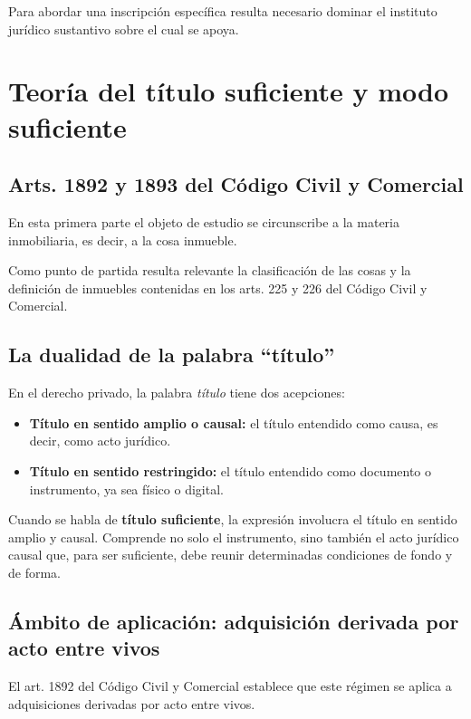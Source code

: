 \documentclass[12pt]{book}
\begin{document}
Para abordar una inscripci\'on espec\'ifica resulta necesario dominar el instituto jur\'idico sustantivo sobre el cual se apoya.

\chapter{Teor\'ia del t\'itulo suficiente y modo suficiente}

\section{Arts. 1892 y 1893 del C\'odigo Civil y Comercial}

En esta primera parte el objeto de estudio se circunscribe a la materia inmobiliaria, es decir, a la cosa inmueble.

Como punto de partida resulta relevante la clasificaci\'on de las cosas y la definici\'on de inmuebles contenidas en los arts. 225 y 226 del C\'odigo Civil y Comercial.

\section{La dualidad de la palabra ``t\'itulo''}

En el derecho privado, la palabra \textit{t\'itulo} tiene dos acepciones:

\begin{itemize}
    \item \textbf{T\'itulo en sentido amplio o causal:} el t\'itulo entendido como causa, es decir, como acto jur\'idico.
    \item \textbf{T\'itulo en sentido restringido:} el t\'itulo entendido como documento o instrumento, ya sea f\'isico o digital.
\end{itemize}

Cuando se habla de \textbf{t\'itulo suficiente}, la expresi\'on involucra el t\'itulo en sentido amplio y causal. Comprende no solo el instrumento, sino tambi\'en el acto jur\'idico causal que, para ser suficiente, debe reunir determinadas condiciones de fondo y de forma.

\section{\'Ambito de aplicaci\'on: adquisici\'on derivada por acto entre vivos}

El art. 1892 del C\'odigo Civil y Comercial establece que este r\'egimen se aplica a adquisiciones derivadas por acto entre vivos.
\end{document}
